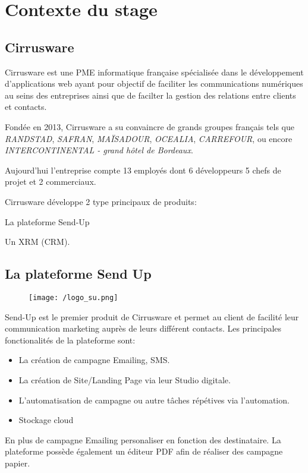 \section{Contexte du stage}
\subsection{Cirrusware}
Cirrusware est une PME informatique française spécialisée dans le développement d'applications web ayant pour objectif de faciliter les communications numériques au seins des entreprises ainsi que de facilter la gestion des relations entre clients et contacts. 

Fondée en 2013, Cirrusware a su convaincre de grands groupes français tels que \textit{RANDSTAD}, \textit{SAFRAN}, \textit{MAÏSADOUR}, \textit{OCEALIA}, \textit{CARREFOUR}, ou encore \textit{INTERCONTINENTAL - grand hôtel de Bordeaux}.


Aujourd'hui l'entreprise compte 13 employés dont 6 développeurs 5 chefs de projet et 2 commerciaux. 


Cirrusware développe 2 type principaux de produits: 
\begin{list}{}{}
    \item La plateforme Send-Up\cite{sendup}
    \item Un XRM (CRM).
\end{list}

\subsection{La plateforme Send Up}
\begin{figure}[!h]
\centering
    \texttt{[image: /logo\_su.png]}

\end{figure}
Send-Up est le premier produit de Cirrusware et permet au client de facilité leur communication marketing auprès de leurs différent contacts.
Les principales fonctionalités de la plateforme sont:
\begin{itemize}
    \item La création de campagne Emailing, SMS. 
    \item La création de Site/Landing Page via leur Studio digitale.
    \item L'automatisation de campagne ou autre tâches répétives via l'automation.
    \item Stockage cloud 
\end{itemize}


En plus de campagne Emailing personaliser en fonction des destinataire. La plateforme possède également un éditeur PDF afin de réaliser des campagne papier. 

